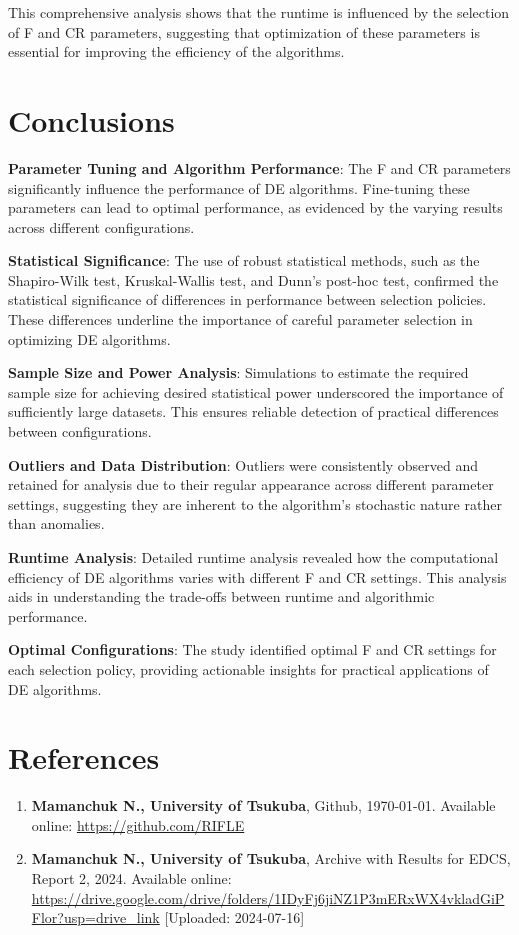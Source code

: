 \documentclass[12pt,a4paper]{article}
\begin{document}
This comprehensive analysis shows that the runtime is influenced by the selection of F and CR parameters, suggesting that optimization of these parameters is essential for improving the efficiency of the algorithms.

\section{Conclusions}
\textbf{Parameter Tuning and Algorithm Performance}: The F and CR parameters significantly influence the performance of DE algorithms. Fine-tuning these parameters can lead to optimal performance, as evidenced by the varying results across different configurations.

\textbf{Statistical Significance}: The use of robust statistical methods, such as the Shapiro-Wilk test, Kruskal-Wallis test, and Dunn's post-hoc test, confirmed the statistical significance of differences in performance between selection policies. These differences underline the importance of careful parameter selection in optimizing DE algorithms.

\textbf{Sample Size and Power Analysis}: Simulations to estimate the required sample size for achieving desired statistical power underscored the importance of sufficiently large datasets. This ensures reliable detection of practical differences between configurations.

\textbf{Outliers and Data Distribution}: Outliers were consistently observed and retained for analysis due to their regular appearance across different parameter settings, suggesting they are inherent to the algorithm's stochastic nature rather than anomalies.

\textbf{Runtime Analysis}: Detailed runtime analysis revealed how the computational efficiency of DE algorithms varies with different F and CR settings. This analysis aids in understanding the trade-offs between runtime and algorithmic performance.

\textbf{Optimal Configurations}: The study identified optimal F and CR settings for each selection policy, providing actionable insights for practical applications of DE algorithms.


\section*{References}
\begin{enumerate}
    \item \textbf{Mamanchuk N., University of Tsukuba}, Github, \today. Available online: \url{https://github.com/RIFLE}
    \item \textbf{Mamanchuk N., University of Tsukuba}, Archive with Results for EDCS, Report 2, 2024. Available online: \url{https://drive.google.com/drive/folders/1IDyFj6jiNZ1P3mERxWX4vkladGiPFlor?usp=drive_link} [Uploaded: 2024-07-16]
\end{enumerate}
\end{document}
